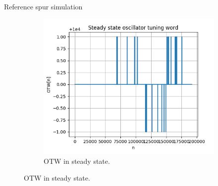 \documentclass[t, screen, aspectratio=43]{beamer}
\begin{document}
\begin{frame}
\begin{block}{Reference spur simulation}
\begin{itemize}
\begin{figure}[htb!]
\begin{subfigure}{.4\textwidth}
	            \includegraphics[width=0.9\linewidth]{otw_ss.png}
	            \caption{\scriptsize OTW in steady state.}
	            \label{fig:rosc_3stg_wave}
	        \end{subfigure}
	        \label{fig:rosc_3stg}
	    \end{figure}
		\end{itemize} 
	\end{block}
\end{frame}
\end{document}
